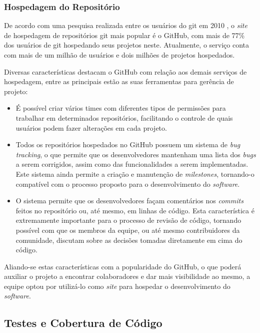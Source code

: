\subsubsection{Hospedagem do Repositório}

De acordo com uma pesquisa realizada entre os usuários do git em 2010 \cite{gitus2010}, o \emph{site} de hospedagem de repositórios git mais popular é o GitHub, com mais de 77\% dos usuários de git hospedando seus projetos neste.
Atualmente, o serviço conta com mais de um milhão de usuários e dois milhões de projetos hospedados. %

Diversas características destacam o GitHub com relação aos demais serviços de hospedagem, entre as principais estão as suas ferramentas para gerência de projeto:

\begin{itemize}
	\item É possível criar vários times com diferentes tipos de permissões para trabalhar em determinados repositórios, facilitando o controle de quais usuários podem fazer alterações em cada projeto.
	\item Todos os repositórios hospedados no GitHub possuem um sistema de \emph{bug tracking}, o que permite que os desenvolvedores mantenham uma lista dos \emph{bugs} a serem corrigidos, assim como das funcionalidades a serem implementadas.
Este sistema ainda permite a criação e manutenção de \emph{milestones}, tornando-o compatível com o processo proposto para o desenvolvimento do \emph{software}.
	\item O sistema permite que os desenvolvedores façam comentários nos \emph{commits} feitos no repositório ou, até mesmo, em linhas de código.
Esta característica é extremamente importante para o processo de revisão de código, tornando possível com que os membros da equipe, ou até mesmo contribuidores da comunidade, discutam sobre as decisões tomadas diretamente em cima do código.
\end{itemize}

Aliando-se estas características com a popularidade do GitHub, o que poderá auxiliar o projeto a encontrar colaboradores e dar mais visibilidade ao mesmo, a equipe optou por utilizá-lo como \emph{site} para hospedar o desenvolvimento do \emph{software}.



\subsection{Testes e Cobertura de Código}\label{met:Cobertura}

